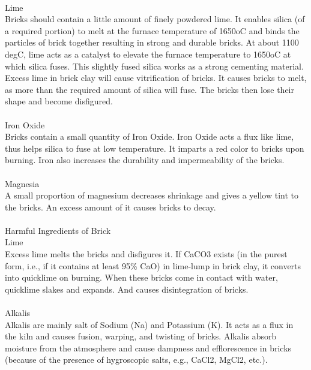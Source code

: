\documentclass{article}
\begin{document}
\vspace{0.1cm}\\
Lime\\
Bricks should contain a little amount of finely powdered lime. It enables silica (of a required portion) to melt at the furnace temperature of 1650oC and binds the particles of brick together resulting in strong and durable bricks. At about 1100 degC, lime acts as a catalyst to elevate the furnace temperature to 1650oC at which silica fuses. This slightly fused silica works as a strong cementing material. Excess lime in brick clay will cause vitrification of bricks. It causes bricks to melt, as more than the required amount of silica will fuse. The bricks then lose their shape and become disfigured.\\
\vspace{0.1cm}\\
Iron Oxide\\
Bricks contain a small quantity of Iron Oxide. Iron Oxide acts a flux like lime, thus helps silica to fuse at low temperature. It imparts a red color to bricks upon burning. Iron also increases the durability and impermeability of the bricks.\\
\vspace{0.1cm}\\
Magnesia\\
A small proportion of magnesium decreases shrinkage and gives a yellow tint to the bricks. An excess amount of it causes bricks to decay.\\
\vspace{0.1cm}\\
Harmful Ingredients of Brick\\
Lime\\
Excess lime melts the bricks and disfigures it. If CaCO3 exists (in the purest form, i.e., if it contains at least 95\% CaO) in lime-lump in brick clay, it converts into quicklime on burning. When these bricks come in contact with water, quicklime slakes and expands. And causes disintegration of bricks.\\
\vspace{0.1cm}\\
Alkalis\\
Alkalis are mainly salt of Sodium (Na) and Potassium (K). It acts as a flux in the kiln and causes fusion, warping, and twisting of bricks. Alkalis absorb moisture from the atmosphere and cause dampness and efflorescence in bricks (because of the presence of hygroscopic salts, e.g., CaCl2, MgCl2, etc.).\\
\end{document}
